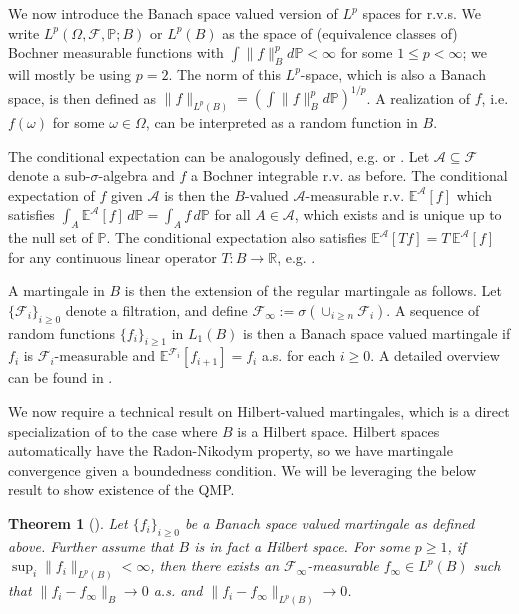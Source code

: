\documentclass[11pt,a4paper]{article}
\newtheorem{thm}{Theorem}
\newcommand{\R}{\mathbb{R}}
\newcommand{\E}{\mathbb{E}}
\begin{document}
\begin{appendices}
We now introduce the Banach space valued version of $L^p$ spaces for r.v.s.
We write $L^p\left(\Omega, \mathcal{F}, \mathbb{P}; B\right)$ or $L^p(B)$ as the space of (equivalence classes of) Bochner measurable functions with $\int \|f\|_B^p d\mathbb{P} < \infty$ for some $1 \leq p < \infty$; we will mostly be using $p = 2$. The norm of this $L^p$-space, which is also a Banach space, is then defined as $\|f\|_{L^p(B)} = \left(\int \|f\|_B^p d\mathbb{P}\right)^{1/p}$. A realization of $f$, i.e. $f(\omega)$ for some $\omega \in \Omega$, can be interpreted as a random function in $B$. 



The conditional expectation can be analogously defined, e.g. \citet[Chapter 1.2]{Pisier2016} or \citet[Chapter 5]{Diestel1977}. Let $\mathcal{A}\subseteq \mathcal{F}$ denote a sub-$\sigma$-algebra and $f$ a Bochner integrable r.v. as before. The conditional expectation of $f$ given $\mathcal{A}$
is then the $B$-valued $\mathcal{A}$-measurable r.v. $\E^{\mathcal{A}}\left[f\right]$ which satisfies $\int_A \E^{\mathcal{A}}\left[f\right]\, d\mathbb{P} = \int_A f \, d \mathbb{P}$
for all $A \in \mathcal{A}$, which exists and is unique up to the null set of $\mathbb{P}$. The conditional expectation also satisfies $\E^{\mathcal{A}}\left[Tf\right]= T\,\E^{\mathcal{A}}\left[f\right]$ for any continuous linear operator $T: B \to \R$, e.g. \cite[Remark 1.11]{Pisier2016}.

A martingale in $B$ is then the extension of the regular martingale as follows. Let $\{\mathcal{F}_i\}_{i \geq 0}$ denote a filtration, and define $\mathcal{F}_\infty := \sigma\left(\cup_{i \geq n}\mathcal{F}_i\right)$. A sequence of random functions $\{f_i\}_{i \geq 1}$ in $L_1(B)$ is then a Banach space valued martingale if $f_i$ is $\mathcal{F}_i$-measurable and $\E^{\mathcal{F}_i}\left[f_{i+1}\right] = f_i$ a.s. for each $i \geq 0$.  A detailed overview can be found in  \citet[Chapter 1.3]{Pisier2016}. 

We now require a technical result on Hilbert-valued martingales, which is a direct specialization of \citet[Theorem 2.9]{Pisier2016} to the case where $B$ is a Hilbert space. Hilbert spaces automatically have the Radon-Nikodym property, so we have martingale convergence given a boundedness condition. We will be leveraging the below result to show existence of the QMP.
\begin{thm}[{\cite[Theorem 2.9]{Pisier2016}}]\label{app:thm_hilbert_mart}
    Let $\{f_i\}_{i \geq 0}$ be a Banach space valued martingale as defined above. Further assume that $B$ is in fact a Hilbert space. For some $p \geq 1$, if $\sup_i \|f_i\|_{L^p(B)} < \infty$, 
    then there exists an $\mathcal{F}_\infty$-measurable $f_\infty \in L^p(B)$ such that 
    $\| f_i - f_\infty \|_{B} \to 0$ a.s. and $\|f_i - f_\infty\|_{L^p(B)} \to 0$.  
\end{thm}





\end{appendices}
\end{document}
